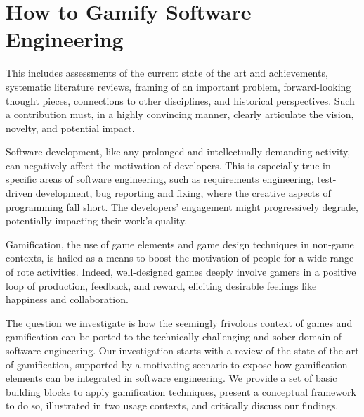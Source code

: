 \chapter{How to Gamify Software Engineering}\label{ch:gamification}


This includes assessments of the current state of the art and achievements, systematic literature reviews, framing of an important problem, forward-looking thought pieces, connections to other disciplines, and historical perspectives.
Such a contribution must, in a highly convincing manner, clearly articulate the vision, novelty, and potential impact.



Software development, like any prolonged and intellectually demanding activity, can negatively affect the motivation of developers.
This is especially true in specific areas of software engineering, such as requirements engineering, test-driven development, bug reporting and fixing, where the creative aspects of programming fall short.
The developers' engagement might progressively degrade, potentially impacting their work's quality.

Gamification, the use of game elements and game design techniques in non-game contexts, is hailed as a means to boost the motivation of people for a wide range of rote activities.
Indeed, well-designed games deeply involve gamers in a positive loop of production, feedback, and reward, eliciting desirable feelings like happiness and collaboration.

The question we investigate is how the seemingly frivolous context of games and gamification can be ported to the technically challenging and sober domain of software engineering.
Our investigation starts with a review of the state of the art of gamification, supported by a motivating scenario to expose how gamification elements can be integrated in software engineering.
We provide a set of basic building blocks to apply gamification techniques, present a conceptual framework to do so, illustrated in two usage contexts, and critically discuss our findings.




